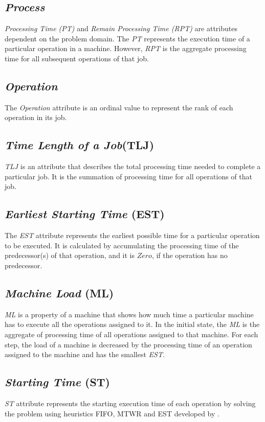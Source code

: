 \documentclass{article}
\begin{document}
\subsection{\textit{Process}}
\textit{Processing Time (PT)}  and \textit{Remain Processing Time (RPT)} are attributes dependent on the problem domain. The \textit{PT} represents the execution time of a particular operation in a machine. However, \textit{RPT} is the aggregate processing time for all subsequent operations of that job.

\subsection{\textit{Operation}}
The \textit{Operation} attribute is an ordinal value to represent the rank of each operation in its job.

\subsection{\textit{Time Length of a Job}(TLJ)}
\textit{TLJ} is an attribute that describes the total processing time needed to complete a particular job. It is the summation of processing time for all operations of that job.

\subsection{\textit{Earliest Starting Time} (EST)}
The \textit{EST} attribute represents the earliest possible time for a particular operation to be executed. It is calculated by accumulating the processing time of the predecessor(s) of that operation, and it is $Zero$, if the operation has no predecessor.

\subsection{\textit{Machine Load} (ML)}
\textit{ML} is a property of a machine that shows how much time a particular machine has to execute all the operations assigned to it. In the initial state, the \textit{ML} is the aggregate of processing time of all operations assigned to that machine. For each step, the load of a machine is decreased by the processing time of an operation assigned to the machine and has the smallest \textit{EST}.

\subsection{\textit{Starting Time} (ST)}
\textit{ST} attribute represents the starting execution time of each operation by solving the problem using heuristics FIFO, MTWR and EST developed by \cite{tassel2021reinforcement,el2020job}.
\end{document}
